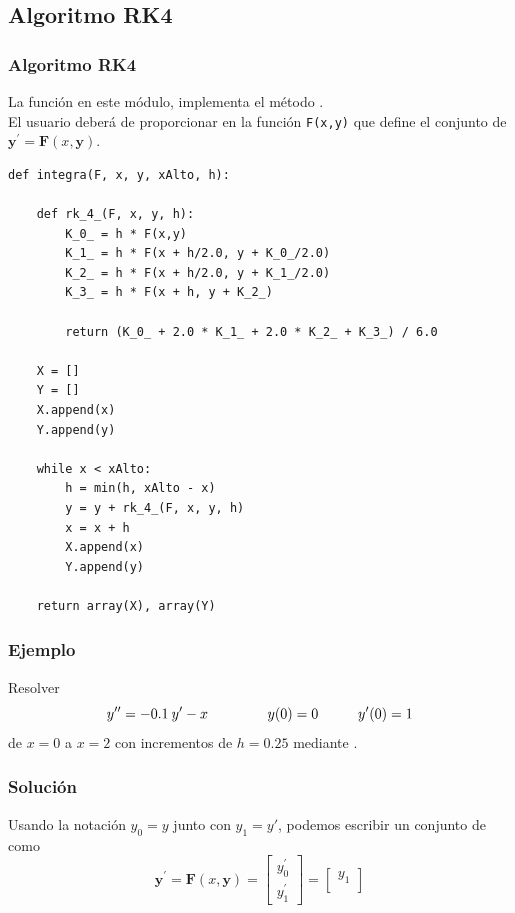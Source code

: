\subsection{Algoritmo RK4}
\begin{frame}
\frametitle{Algoritmo RK4}
La función  en este módulo, implementa el método .
\\
\bigskip
El usuario deberá de proporcionar en  la función \texttt{F(x,y)} que define el conjunto de  $\mathbf{y}^{\prime} = \mathbf{F}(x,\mathbf{y})$. 
\end{frame}
\begin{frame}
\begin{lstlisting}[caption=Código para la función integra, style=FormattedNumber, basicstyle=\linespread{1.1}\ttfamily=\small, columns=fullflexible]
def integra(F, x, y, xAlto, h):
    
    def rk_4_(F, x, y, h):
        K_0_ = h * F(x,y)
        K_1_ = h * F(x + h/2.0, y + K_0_/2.0)
        K_2_ = h * F(x + h/2.0, y + K_1_/2.0)
        K_3_ = h * F(x + h, y + K_2_)
        
        return (K_0_ + 2.0 * K_1_ + 2.0 * K_2_ + K_3_) / 6.0
    
    X = []
    Y = []
    X.append(x)
    Y.append(y)

    while x < xAlto:
        h = min(h, xAlto - x)
        y = y + rk_4_(F, x, y, h)
        x = x + h
        X.append(x)
        Y.append(y)
    
    return array(X), array(Y)
\end{lstlisting}
\end{frame}
\begin{frame}
\frametitle{Ejemplo}
Resolver
\[ y^{\prime \prime} = -0.1 \: y^{\prime} - x \hspace{1.5cm} y(0) = 0 \hspace{1cm} y^{\prime}(0)=1\]
de $x = 0$ a $x = 2$ con incrementos de $h = 0.25$ mediante .
\end{frame}
\begin{frame}
\frametitle{Solución}
Usando la notación $y_{0} = y$ junto con $y_{1} = y'$, podemos escribir un conjunto de  como
\begin{equation*} 
\mathbf{y}^{\prime} = \mathbf{F}(x,\mathbf{y}) =
\begin{bmatrix}
y^{\prime}_{0} \\
y^{\prime}_{1}
\end{bmatrix} = 
\begin{bmatrix}
y_{1} \\

\end{bmatrix}
\end{equation*}
\end{frame}
